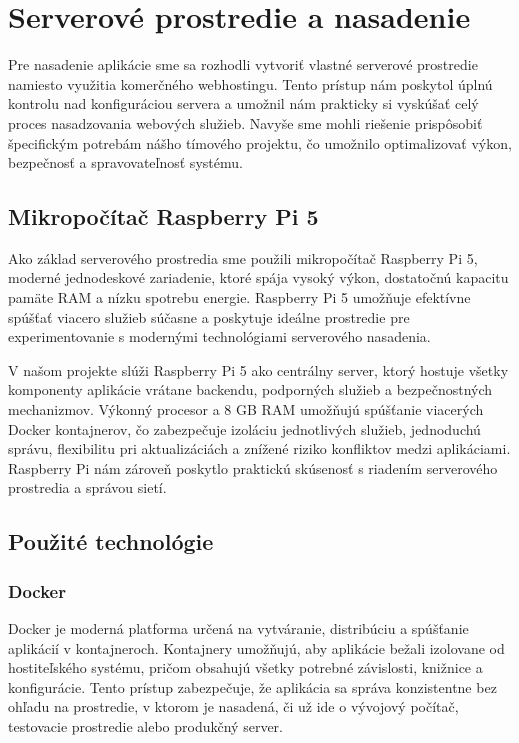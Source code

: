 \section{Serverové prostredie a nasadenie}

Pre nasadenie aplikácie sme sa rozhodli vytvoriť vlastné serverové prostredie namiesto využitia komerčného webhostingu. Tento prístup nám poskytol úplnú kontrolu nad konfiguráciou servera a umožnil nám prakticky si vyskúšať celý proces nasadzovania webových služieb. Navyše sme mohli riešenie prispôsobiť špecifickým potrebám nášho tímového projektu, čo umožnilo optimalizovať výkon, bezpečnosť a spravovateľnosť systému.

\subsection{Mikropočítač Raspberry Pi 5}

Ako základ serverového prostredia sme použili mikropočítač Raspberry Pi 5, moderné jednodeskové zariadenie, ktoré spája vysoký výkon, dostatočnú kapacitu pamäte RAM a nízku spotrebu energie. Raspberry Pi 5 umožňuje efektívne spúšťať viacero služieb súčasne a poskytuje ideálne prostredie pre experimentovanie s modernými technológiami serverového nasadenia.

V našom projekte slúži Raspberry Pi 5 ako centrálny server, ktorý hostuje všetky komponenty aplikácie vrátane backendu, podporných služieb a bezpečnostných mechanizmov. Výkonný procesor a 8 GB RAM umožňujú spúšťanie viacerých Docker kontajnerov, čo zabezpečuje izoláciu jednotlivých služieb, jednoduchú správu, flexibilitu pri aktualizáciách a znížené riziko konfliktov medzi aplikáciami. Raspberry Pi nám zároveň poskytlo praktickú skúsenosť s riadením serverového prostredia a správou sietí.

\subsection{Použité technológie}

\subsubsection{Docker}

Docker je moderná platforma určená na vytváranie, distribúciu a spúšťanie aplikácií v kontajneroch. Kontajnery umožňujú, aby aplikácie bežali izolovane od hostiteľského systému, pričom obsahujú všetky potrebné závislosti, knižnice a konfigurácie. Tento prístup zabezpečuje, že aplikácia sa správa konzistentne bez ohľadu na prostredie, v ktorom je nasadená, či už ide o vývojový počítač, testovacie prostredie alebo produkčný server.

